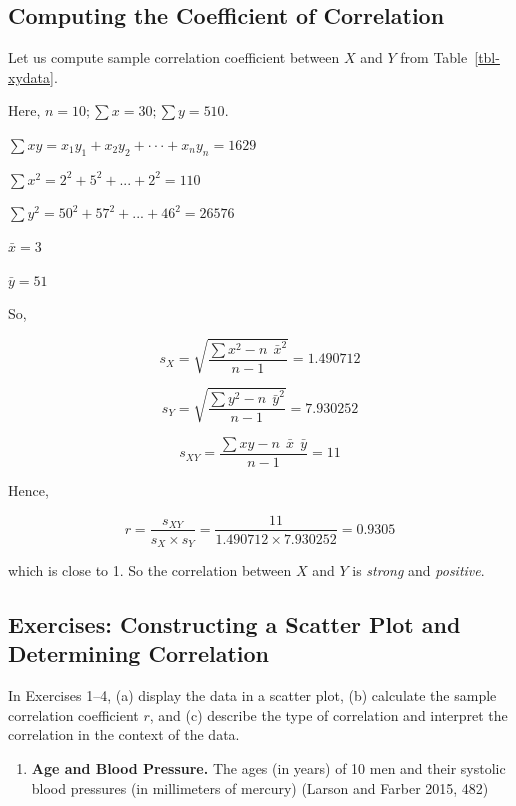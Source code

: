 \documentclass[
  11pt,
  letterpaper,
  DIV=11,
  numbers=noendperiod]{scrreprt}
\providecommand{\tightlist}{%
  \setlength{\itemsep}{0pt}\setlength{\parskip}{0pt}}
\begin{document}
\subsection{Computing the Coefficient of
Correlation}\label{computing-the-coefficient-of-correlation}

Let us compute sample correlation coefficient between \(X\) and \(Y\)
from Table~\ref{tbl-xydata}.

Here, \(n=10 ; \sum x=30 ; \sum y =510\).

\(\sum xy =x_1y_1+x_2y_2+ \cdot \cdot \cdot+x_ny_n= 1629\)

\(\sum x^2=2^2+5^2 +...+2^2=110\)

\(\sum y^2=50^2+57^2 +...+46^2=26576\)

\(\bar x =3\)

\(\bar y =51\)

So,

\[s_X=\sqrt { \frac{\sum x^2 -n \ \  \bar x^2}{n-1}}=1.490712\]

\[s_Y=\sqrt { \frac{\sum y^2 -n \ \ \bar y^2}{n-1}}=7.930252\]

\[s_{XY}=\frac{\sum xy -n \ \ \bar x \ \ \bar y }{n-1}=11\]

Hence,

\[r=\frac{s_{XY}}{s_X \times s_Y}=\frac{11}{1.490712\times 7.930252}=0.9305\]

which is close to 1. So the correlation between \(X\) and \(Y\) is
\emph{strong} and \emph{positive}.

\subsection{Exercises: Constructing a Scatter Plot and Determining
Correlation}\label{exercises-constructing-a-scatter-plot-and-determining-correlation}

In Exercises 1--4, (a) display the data in a scatter plot, (b) calculate
the sample correlation coefficient \(r\), and (c) describe the type of
correlation and interpret the correlation in the context of the data.

\begin{enumerate}
\def\labelenumi{\arabic{enumi}.}
\tightlist
\item
  \textbf{Age and Blood Pressure.} The ages (in years) of 10 men and
  their systolic blood pressures (in millimeters of mercury) (Larson and
  Farber 2015, 482)
\end{enumerate}
\end{document}
